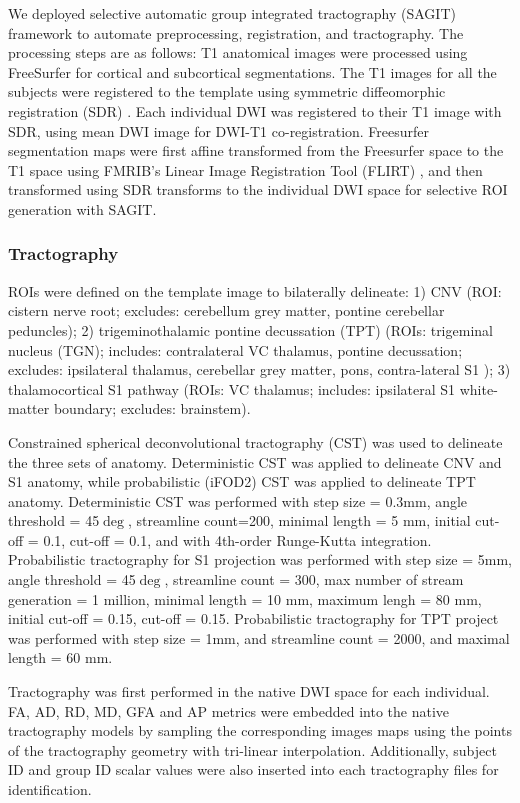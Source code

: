 We deployed selective automatic group integrated tractography (SAGIT) framework to automate preprocessing, registration, and tractography. The processing steps are as follows: T1 anatomical images were processed using FreeSurfer \cite{Fischl2004} for cortical and subcortical segmentations. The T1 images for all the subjects were registered to the template using symmetric diffeomorphic registration (SDR) \cite{Avants2008b}. Each individual DWI was registered to their T1 image with SDR, using mean DWI image for DWI-T1 co-registration. Freesurfer segmentation maps were first affine transformed from the Freesurfer space to the T1 space using FMRIB's Linear Image Registration Tool (FLIRT) \cite{Jenkinson2001,Jenkinson2002}, and then transformed using SDR transforms to the individual DWI space for selective ROI generation with SAGIT. 

\subsubsection{Tractography}
ROIs were defined on the template image to bilaterally delineate: 1) CNV (ROI: cistern nerve root; excludes: cerebellum grey matter, pontine cerebellar peduncles); 2) trigeminothalamic pontine decussation (TPT) (ROIs: trigeminal nucleus (TGN); includes: contralateral VC thalamus, pontine decussation; excludes: ipsilateral thalamus, cerebellar grey matter, pons, contra-lateral S1 ); 3) thalamocortical S1 pathway (ROIs: VC thalamus; includes: ipsilateral S1 white-matter boundary; excludes: brainstem).  

Constrained spherical deconvolutional tractography (CST) \cite{Tournier2012b} was used to delineate the three sets of anatomy. Deterministic CST was applied to delineate CNV and S1 anatomy, while probabilistic (iFOD2) CST \cite{Jeurissen2011b,Tournier2010} was applied to delineate TPT anatomy. Deterministic CST was performed with step size = 0.3mm, angle threshold = 45$\deg$, streamline count=200, minimal length = 5 mm, initial cut-off = 0.1, cut-off = 0.1, and with 4th-order Runge-Kutta integration. Probabilistic tractography for S1 projection was performed with step size = 5mm, angle threshold = 45$\deg$, streamline count = 300, max number of stream generation = 1 million, minimal length = 10 mm, maximum lengh = 80 mm, initial cut-off = 0.15, cut-off = 0.15. Probabilistic tractography for TPT project was performed with step size = 1mm, and streamline count = 2000, and maximal length = 60 mm. 

Tractography was first performed in the native DWI space for each individual.  FA, AD, RD, MD, GFA and AP metrics were embedded into the native tractography models by sampling the corresponding images maps using the points of the tractography geometry with tri-linear interpolation. Additionally, subject ID and group ID scalar values were also inserted into each tractography files for identification. 

